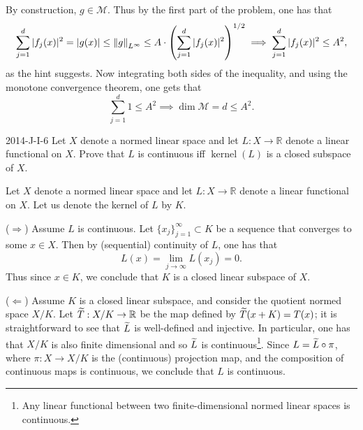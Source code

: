 \documentclass{article}
\begin{document}
\begin{enumerate}[itemsep =-2pt,label = (\alph{*})]
\begin{align*}
\begin{split}
			\end{split}
		\end{align*}
		By construction, $g \in \mathcal{M}$. Thus by the first part of the problem, one has that 
		\begin{equation*}
			\sum_{j= 1}^{d}|f_{j}(x)|^2 = |g(x)| \leq \left\Vert g \right\Vert_{L^\infty} \leq A \cdot \left(\sum_{j = 1}^{d}|f_{j}(x)|^2\right)^{1/2} \implies \sum_{j = 1}^{d}|f_{j}(x)|^2 \leq A^2, 
		\end{equation*}
		as the hint suggests. Now integrating both sides of the inequality, and using the monotone convergence theorem, one gets that 
		\begin{equation*}
			\sum_{j = 1}^{d}1 \leq A^{2} \implies \dim{\mathcal{M}} = d \leq A^2. 
		\end{equation*}
	\end{enumerate}
	
	\begin{prb}{2014-J-I-6}
		Let $X$ denote a normed linear space and let $L: X \to \mathbb{R}$ denote a linear functional on $X$. Prove that $L$ is continuous iff $\operatorname{kernel}(L)$ is a closed subspace of $X$. 
	\end{prb}
	Let $X$ denote a normed linear space and let $L: X \to \mathbb{R}$ denote a linear functional on $X$. Let us denote the kernel of $L$ by $K$. 
	
	($\Longrightarrow$) Assume $L$ is continuous. Let $\{x_{j}\}_{j = 1}^{\infty} \subset K$ be a sequence that converges to some $x \in X$. Then by (sequential) continuity of $L$, one has that 
	\begin{equation*}
		L(x) = \lim_{j \to \infty}L(x_{j}) = 0. 
	\end{equation*}
	Thus since $x \in K$, we conclude that $K$ is a closed linear subspace of $X$. 
	
	($\Longleftarrow$) Assume $K$ is a closed linear subspace, and consider the quotient normed space $X/K$. Let $\widetilde{T}: X/K \to \mathbb{R}$ be the map defined by $\widetilde{T}(x + K) = T(x)$; it is straightforward to see that $\widetilde{L}$ is well-defined and injective. In particular, one has that $X/K$ is also finite dimensional and so $\widetilde{L}$ is continuous\footnote{Any linear functional between two finite-dimensional normed linear spaces is continuous.}. Since $L = \widetilde{L} \circ \pi$, where $\pi: X \to X/K$ is the (continuous) projection map, and the composition of continuous maps is continuous, we conclude that $L$ is continuous. 
	
\end{document}
